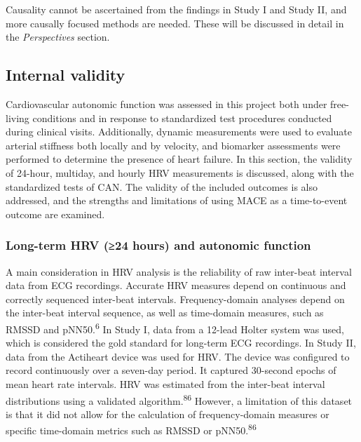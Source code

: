 \documentclass[
  a4paper,
  headsepline=true,
  open=left]{scrbook}
\begin{document}
Causality cannot be ascertained from the findings in Study I and Study
II, and more causally focused methods are needed. These will be
discussed in detail in the \emph{Perspectives} section.

\hypertarget{internal-validity}{%
\subsection{Internal validity}\label{internal-validity}}

Cardiovascular autonomic function was assessed in this project both
under free-living conditions and in response to standardized test
procedures conducted during clinical visits. Additionally, dynamic
measurements were used to evaluate arterial stiffness both locally and
by velocity, and biomarker assessments were performed to determine the
presence of heart failure. In this section, the validity of 24-hour,
multiday, and hourly HRV measurements is discussed, along with the
standardized tests of CAN. The validity of the included outcomes is also
addressed, and the strengths and limitations of using MACE as a
time-to-event outcome are examined.

\hypertarget{long-term-hrv-24-hours-and-autonomic-function}{%
\subsubsection{Long-term HRV (≥24 hours) and autonomic
function}\label{long-term-hrv-24-hours-and-autonomic-function}}

A main consideration in HRV analysis is the reliability of raw
inter-beat interval data from ECG recordings. Accurate HRV measures
depend on continuous and correctly sequenced inter-beat intervals.
Frequency-domain analyses depend on the inter-beat interval sequence, as
well as time-domain measures, such as RMSSD and
pNN50.\textsuperscript{6} In Study I, data from a 12-lead Holter system
was used, which is considered the gold standard for long-term ECG
recordings. In Study II, data from the Actiheart device was used for
HRV. The device was configured to record continuously over a seven-day
period. It captured 30-second epochs of mean heart rate intervals. HRV
was estimated from the inter-beat interval distributions using a
validated algorithm.\textsuperscript{86} However, a limitation of this
dataset is that it did not allow for the calculation of frequency-domain
measures or specific time-domain metrics such as RMSSD or
pNN50.\textsuperscript{86}
\end{document}
